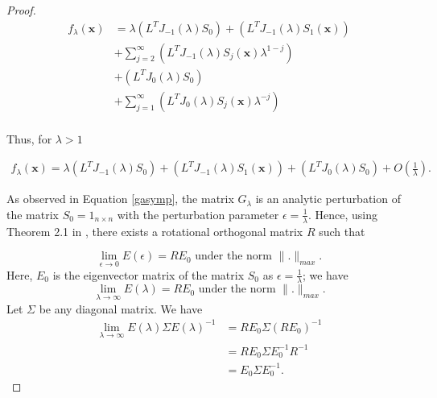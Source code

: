 \documentclass[multixcb]{amstext-l}
\theoremstyle{plain}
\theoremstyle{definition}
\theoremstyle{definition}
\theoremstyle{remark}
\numberwithin{equation}{chapter}
\begin{document}
\begin{proof}
 
 
 \begin{equation}\label{eq60}
 \begin{aligned}
     f_{\lambda}(\boldsymbol{x}) &=    \lambda\left( L^TJ_{-1}(\lambda)S_0\right) + \left(L^TJ_{-1}(\lambda)S_1(\boldsymbol{x})\right)\\ 
                    &+  \sum_{j=2}^{\infty}\left(L^TJ_{-1}(\lambda)S_{j}(\boldsymbol{x})\lambda^{1-j}  \right) \\
                    &+ \left(L^TJ_{0}(\lambda)S_0\right)\\
                    &+ \sum_{j=1}^{\infty}\left(L^TJ_0(\lambda) S_{j}(\boldsymbol{x})\lambda^{-j}  \right) \\
     \end{aligned}
\end{equation}
 
Thus, for $\lambda>1$%
 
\begin{align}
\label{eq61}
      f_{\lambda}(\boldsymbol{x}) = \lambda\left( L^TJ_{-1}(\lambda)S_0\right) + \left(L^TJ_{-1}(\lambda)S_1(\boldsymbol{x})\right)
      + \left(L^TJ_{0}(\lambda)S_0\right) + O(\frac{1}{\lambda}).
\end{align}
     
     
As observed in Equation \ref{gasymp}, the matrix $G_{\lambda}$ is an analytic perturbation of the matrix $S_0 = 1_{n\times n}$ with the perturbation parameter $\epsilon = \frac{1}{\lambda}$. Hence, using Theorem 2.1 in \cite{JMLR:v18:16-140}, there exists a rotational orthogonal matrix $R$ such that

\begin{equation}
    \lim\limits_{\epsilon\to 0}E(\epsilon) = RE_{0} \mbox{ under the norm } \|.\|_{max}.
\end{equation}
Here, $E_0$ is the eigenvector matrix of the matrix $S_0$
as $\epsilon = \frac{1}{\lambda}$; we have 
\begin{equation}
    \lim\limits_{\lambda\to \infty}E(\lambda) = RE_{0} \mbox{ under the norm } \|.\|_{max}.
\end{equation}
Let $\Sigma$ be any diagonal matrix. We have \begin{equation}
\begin{aligned}
    \lim\limits_{\lambda\to\infty}E(\lambda)\Sigma E(\lambda)^{-1} &= RE_0\Sigma (RE_0)^{-1}\\
    &= RE_0\Sigma E_0^{-1}R^{-1}\\
    &= E_0\Sigma E_0^{-1}.
    \end{aligned}
\end{equation}


\end{proof}
\end{document}
